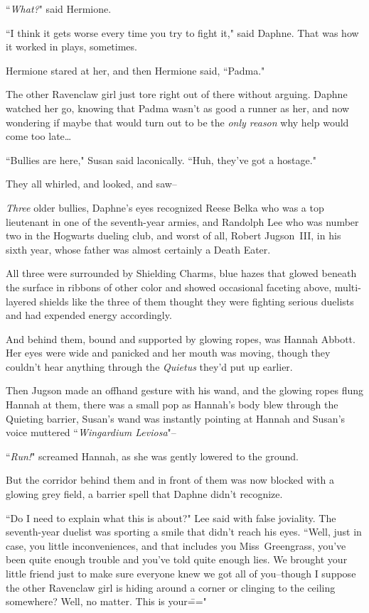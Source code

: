 ``\emph{What?}" said Hermione.

``I think it gets worse every time you try to fight it," said Daphne. That was how it worked in plays, sometimes.

Hermione stared at her, and then Hermione said, ``Padma."

The other Ravenclaw girl just tore right out of there without arguing. Daphne watched her go, knowing that Padma wasn't as good a runner as her, and now wondering if maybe that would turn out to be the \emph{only reason} why help would come too late{\ldots}

``Bullies are here," Susan said laconically. ``Huh, they've got a hostage."

They all whirled, and looked, and saw\---

\emph{Three} older bullies, Daphne's eyes recognized Reese Belka who was a top lieutenant in one of the seventh-year armies, and Randolph Lee who was number two in the Hogwarts dueling club, and worst of all, Robert Jugson~III, in his sixth year, whose father was almost certainly a Death Eater.

All three were surrounded by Shielding Charms, blue hazes that glowed beneath the surface in ribbons of other color and showed occasional faceting above, multi-layered shields like the three of them thought they were fighting serious duelists and had expended energy accordingly.

And behind them, bound and supported by glowing ropes, was Hannah Abbott. Her eyes were wide and panicked and her mouth was moving, though they couldn't hear anything through the \emph{Quietus} they'd put up earlier.

Then Jugson made an offhand gesture with his wand, and the glowing ropes flung Hannah at them, there was a small pop as Hannah's body blew through the Quieting barrier, Susan's wand was instantly pointing at Hannah and Susan's voice muttered ``\emph{Wingardium Leviosa}"\---

``\emph{Run!}" screamed Hannah, as she was gently lowered to the ground.

But the corridor behind them and in front of them was now blocked with a glowing grey field, a barrier spell that Daphne didn't recognize.

``Do I need to explain what this is about?" Lee said with false joviality. The seventh-year duelist was sporting a smile that didn't reach his eyes. ``Well, just in case, you little inconveniences, and that includes you Miss~Greengrass, you've been quite enough trouble and you've told quite enough lies. We brought your little friend just to make sure everyone knew we got all of you\---though I suppose the other Ravenclaw girl is hiding around a corner or clinging to the ceiling somewhere? Well, no matter. This is your\==="

